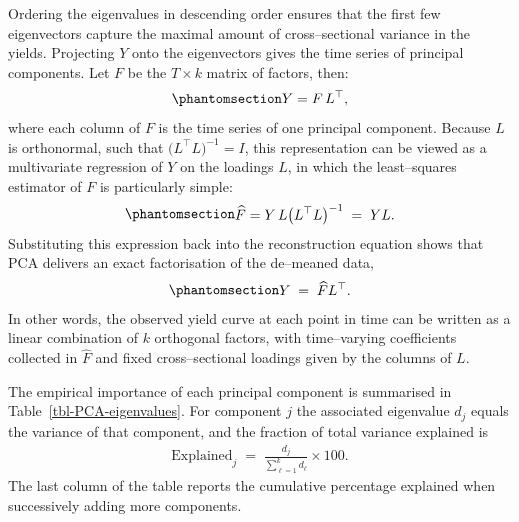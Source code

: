 \documentclass[
  letterpaper,
  DIV=11,
  numbers=noendperiod]{scrreprt}
\begin{document}
Ordering the eigenvalues in descending order ensures that the first few
eigenvectors capture the maximal amount of cross--sectional variance in
the yields. Projecting \(Y\) onto the eigenvectors gives the time series
of principal components. Let \(F\) be the \(T\times k\) matrix of
factors, then:
\begin{equation}\protect\phantomsection\label{eq-PCA-projection}{
\begin{align}
    Y = F\, L^{\top},
\end{align}
}\end{equation} where each column of \(F\) is the time series of one
principal component. Because \(L\) is orthonormal, such that
\((L^{\top}L\big)^{-1}=I\), this representation can be viewed as a
multivariate regression of \(Y\) on the loadings \(L\), in which the
least--squares estimator of \(F\) is particularly simple:
\begin{equation}\protect\phantomsection\label{eq-PCA-Fhat}{
\begin{align}
    \widehat{F} = Y\, L \big(L^{\top}L\big)^{-1} \;=\; Y L.
\end{align}
}\end{equation} Substituting this expression back into the
reconstruction equation shows that PCA delivers an exact factorisation
of the de--meaned data,
\begin{equation}\protect\phantomsection\label{eq-PCA-exact-recon}{
\begin{align}
    Y \;=\; \widehat{F} L^{\top}.
\end{align}
}\end{equation} In other words, the observed yield curve at each point
in time can be written as a linear combination of \(k\) orthogonal
factors, with time--varying coefficients collected in \(\widehat{F}\)
and fixed cross--sectional loadings given by the columns of \(L\).

The empirical importance of each principal component is summarised in
Table~\ref{tbl-PCA-eigenvalues}. For component \(j\) the associated
eigenvalue \(d_j\) equals the variance of that component, and the
fraction of total variance explained is
\begin{align}
    \text{Explained}_j \;=\; \frac{d_j}{\sum_{\ell=1}^k d_\ell}\times 100 .
\end{align}
The last column of the table reports the cumulative percentage explained
when successively adding more components.
\end{document}
